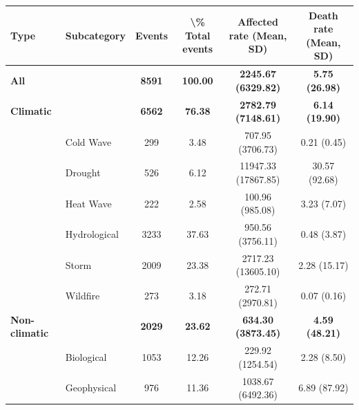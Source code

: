 \begin{table}[H]
\centering
\begin{tabular}{llcccc}
\toprule
Type & Subcategory & Events & \textbackslash{}\% Total events & Affected rate (Mean, SD) & Death rate (Mean, SD)\\
\midrule
\textbf{All} & \textbf{} & \textbf{8591} & \textbf{100.00} & \textbf{2245.67 (6329.82)} & \textbf{5.75 (26.98)}\\
\addlinespace
\textbf{Climatic} & \textbf{} & \textbf{6562} & \textbf{76.38} & \textbf{2782.79 (7148.61)} & \textbf{6.14 (19.90)}\\
\addlinespace
\hspace{1em} & Cold Wave & 299 & 3.48 & 707.95 (3706.73) & 0.21 (0.45)\\
\hspace{1em} & Drought & 526 & 6.12 & 11947.33 (17867.85) & 30.57 (92.68)\\
\hspace{1em} & Heat Wave & 222 & 2.58 & 100.96 (985.08) & 3.23 (7.07)\\
\addlinespace
\hspace{1em} & Hydrological & 3233 & 37.63 & 950.56 (3756.11) & 0.48 (3.87)\\
\hspace{1em} & Storm & 2009 & 23.38 & 2717.23 (13605.10) & 2.28 (15.17)\\
\hspace{1em} & Wildfire & 273 & 3.18 & 272.71 (2970.81) & 0.07 (0.16)\\
\textbf{Non-climatic} & \textbf{} & \textbf{2029} & \textbf{23.62} & \textbf{634.30 (3873.45)} & \textbf{4.59 (48.21)}\\
\addlinespace
\hspace{1em} & Biological & 1053 & 12.26 & 229.92 (1254.54) & 2.28 (8.50)\\
\addlinespace
\hspace{1em} & Geophysical & 976 & 11.36 & 1038.67 (6492.36) & 6.89 (87.92)\\
\bottomrule
\end{tabular}
\end{table}
